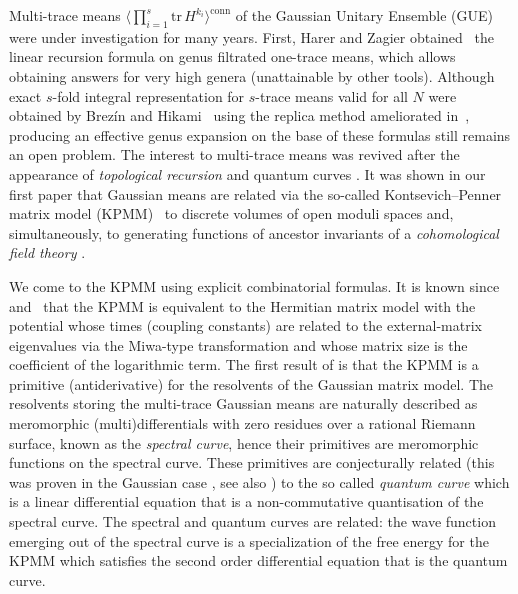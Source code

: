 \documentclass[11pt]{article}
\def\<{\langle}
\def\>{\rangle}
\def\tr{{\mathrm{tr\,}}}
\theoremstyle{plain}
\theoremstyle{definition}
\begin{document}
Multi-trace means $\<\prod_{i=1}^s \tr H^{k_i}\>^{{\mathrm{conn}}}$ of the Gaussian Unitary Ensemble (GUE) were under investigation for many years. First, Harer and Zagier obtained~\cite{HZ} the linear recursion formula on genus filtrated one-trace means, which allows 
obtaining answers for very high genera (unattainable by other tools). Although exact  
$s$-fold integral representation for $s$-trace means valid for all $N$ were obtained by Brez\'in and Hikami~\cite{BreHik} using the replica
method ameliorated in~\cite{MS10}, producing an effective genus expansion on the base of these formulas still remains an open problem.
The interest to multi-trace means was revived after the appearance of {\em topological recursion} \cite{ChEy,EOrInv} and quantum curves \cite{GSuApo,MSuSpe,DM14}.  It was shown in our first paper \cite{ACNP} that Gaussian means are related via the so-called Kontsevich--Penner
matrix model (KPMM)~\cite{ChMak1,ACKM}
to discrete volumes of open moduli spaces and, simultaneously, to generating functions of ancestor invariants of a
{\em cohomological field theory} \cite{ManFro}.

We come to the KPMM using explicit combinatorial formulas.  
It is known since~\cite{ChMak2} and~\cite{MMM} that the KPMM is
equivalent to the Hermitian matrix model with the potential whose times (coupling constants) are related to
the external-matrix eigenvalues via the Miwa-type transformation and whose matrix size is the coefficient of
the logarithmic term.  The first result of \cite{ACNP} is that the KPMM is a primitive (antiderivative) for the resolvents of the Gaussian matrix model.  The resolvents storing the multi-trace Gaussian means are naturally described as meromorphic (multi)differentials with zero residues over a rational Riemann surface, known as the {\em spectral curve}, hence their primitives are meromorphic functions on the spectral curve.  These primitives are conjecturally related (this was proven in the Gaussian case \cite{MSuSpe}, see also \cite{Norbury15}) to the so called {\em quantum curve} which is a linear differential equation that is a non-commutative quantisation of the spectral curve.  
The spectral and quantum curves are related: the wave function 
emerging out of the spectral curve is a specialization of the free energy for the KPMM which satisfies the second order differential equation that is the quantum curve.
\end{document}
